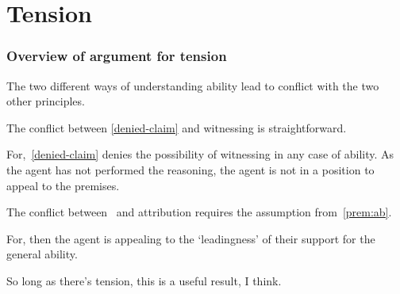 
\chapter{Tension}
\label{cha:tension}

\subsection{Overview of argument for tension}
\label{sec:overv-argum-tens}

\begin{note}
  The two different ways of understanding ability lead to conflict with the two other principles.
\end{note}

\begin{note}[Witnessing]
  The conflict between \ref{denied-claim} and witnessing is straightforward.

  For,~\ref{denied-claim} denies the possibility of witnessing in any case of ability.
  As the agent has not performed the reasoning, the agent is not in a position to appeal to the premises.
\end{note}

\begin{note}[Attribution]
  The conflict between~\nI{} and attribution requires the assumption from~\ref{prem:ab}.

  For, then the agent is appealing to the `leadingness' of their support for the general ability.
\end{note}

\begin{note}
  So long as there's tension, this is a useful result, I think.
\end{note}

